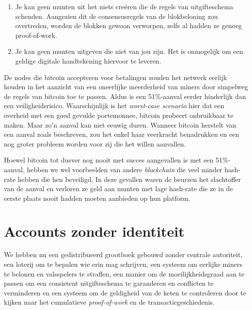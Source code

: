 \documentclass[
  letterpaper,
]{scrbook}
\begin{document}
\begin{enumerate}
\def\labelenumi{\arabic{enumi}.}
\item
  Je kan geen munten uit het niets creëren die de regels van
  uitgifteschema schenden. Aangezien dit de consensusregels van de
  blokbeloning zou overtreden, worden de blokken gewoon verworpen, zelfs
  al hadden ze genoeg proof-of-work.
\item
  Je kan geen munten uitgeven die niet van jou zijn. Het is onmogelijk
  om een geldige digitale handtekening hiervoor te leveren.
\end{enumerate}

De nodes die bitcoin accepteren voor betalingen zouden het netwerk
eerlijk houden in het aanzicht van een oneerlijke meerderheid van miners
door simpelweg de regels van bitcoin toe te passen. Aldus is een
51\%-aanval eerder hinderlijk dan een veiligheidsrisico. Waarschijnlijk
is het \emph{worst-case scenario} hier dat een overheid met een goed
gevulde portemonnee, bitcoin probeert onbruikbaar te maken. Maar zo'n
aanval kan niet eeuwig duren. Wanneer bitcoin herstelt van een aanval
zoals beschreven, zou het enkel haar veerkracht benadrukken en een nog
groter probleem worden voor zij die het willen aanvallen.

Hoewel bitcoin tot dusver nog nooit met succes aangevallen is met een
51\%-aanval, hebben we wel voorbeelden van andere \emph{blockchain} die
veel minder hash-rate hebben die hen beveiligd. In deze gevallen waren
de beurzen het slachtoffer van de aanval en verloren ze geld aan munten
met lage hash-rate die ze in de eerste plaats nooit hadden moeten
aanbieden op hun platform.


\hypertarget{accounts-zonder-identiteit}{%
\chapter{Accounts zonder identiteit}\label{accounts-zonder-identiteit}}

We hebben nu een gedistribueerd grootboek gebouwd zonder centrale
autoriteit, een loterij om te bepalen wie erin mag schrijven, een
systeem om eerlijke miners te belonen en valsspelers te straffen, een
manier om de moeilijkheidsgraad aan te passen om een consistent
uitgifteschema te garanderen en conflicten te verminderen en een systeem
om de geldigheid van de keten te controleren door te kijken naar het
cumulatieve \emph{proof-of-work} en de transactiegeschiedenis.
\end{document}
